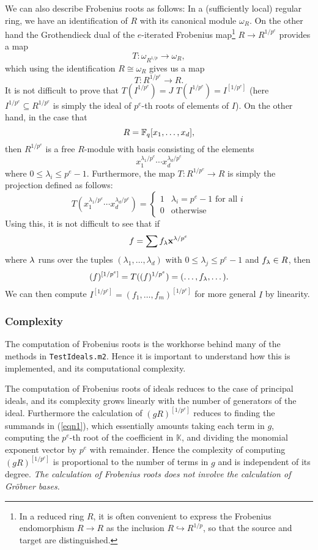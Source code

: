 \documentclass[11pt]{amsart}
\begin{document}
We can also describe Frobenius roots as follows:  In a (sufficiently local) regular ring, we have an identification of $R$ with its canonical module $\omega_R$.  On the other hand the Grothendieck dual of the $e$-iterated Frobenius map\footnote{In a reduced ring $R$, it is often convenient to express the Frobenius endomorphism $R \to R$ as the inclusion $R \hookrightarrow R^{1/p}$, so that the source and target  are distinguished.} $R \to R^{1/p^e}$ provides a map
\begin{equation}
\label{eq.DualToFrobenius}
T : \omega_{R^{1/p}} \to \omega_R,
\end{equation}
which using the identification $R \cong \omega_R$ gives us a map
\[
T : R^{1/p^e} \to R.
\]
It is not difficult to prove that 
\sout{$T(I^{1/p^e}) = J$}
$T(I^{1/p^e})=I^{[1/p^e]}$
(here $I^{1/p^e} \subseteq R^{1/p^e}$ is simply the ideal of $p^e$-th roots of elements of $I$).  On the other hand, in the case that
\[
R = \mathbb{F}_q[x_1, \ldots, x_d],
\]
then $R^{1/p^e}$ is a free $R$-module with basis consisting of the elements
\[
 x_1^{\lambda_1/p^e} \cdots x_d^{\lambda_d/p^e}
\]
where $0 \leq \lambda_i \leq p^e-1$.
Furthermore, the map $T : R^{1/p^e} \to R$ is simply the projection defined as follows:
\[
T(x_1^{\lambda_1/p^e} \cdots x_d^{\lambda_d/p^e}) = \left\{ \begin{array}{rl} 1 & \lambda_i = p^{e}-1 \text{ for all }i \\ 0 & \text{otherwise}  \end{array} \right.
\]
Using this, it is not difficult to see that if
\begin{equation}
\label{eqn1}
f = \sum f_{\bf \lambda} {\bf x}^{{\bf \lambda} / p^e}
\end{equation}
where ${\bf \lambda}$ runs over the tuples $(\lambda_1, \dots, \lambda_d)$ with $0 \leq \lambda_j \leq p^e-1$ and $f_{\bf \lambda} \in R$, then
\[
(f)^{[1/p^e]} = T( (f)^{1/p^e}) = (\dots, f_{\bf \lambda}, \dots).
\]
We can then compute $I^{[1/p^e]} = (f_1, \dots, f_m)^{[1/p^e]}$ for more general $I$ by linearity.

\subsubsection{Complexity}
The computation of Frobenius roots is the workhorse behind many of the methods in \texttt{TestIdeals.m2}.
Hence it is important to understand how this is implemented, and its computational complexity.

The computation of Frobenius roots of ideals reduces to the case of principal ideals, and its complexity grows linearly with the number of generators of the ideal.
Furthermore the calculation of  $(gR)^{[1/p^e]}$ reduces to finding the summands in (\ref{eqn1}), which essentially amounts
taking each term in $g$, computing the $p^e$-th root of the coefficient in $\mathbb{K}$, and dividing the monomial exponent vector by $p^e$ with remainder.
Hence the complexity of  computing $(gR)^{[1/p^e]}$ is proportional to the number of terms in $g$ and is independent of its degree.
\emph{The calculation of Frobenius roots does not involve the calculation of Gr\"obner bases.}
\end{document}
